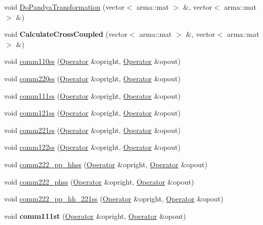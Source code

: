\begin{DoxyCompactItemize}
\item 
void \hyperlink{classOperator_ad468922e03d15318c23886e6bfecc168}{Do\-Pandya\-Transformation} (vector$<$ arma\-::mat $>$ \&, vector$<$ arma\-::mat $>$ \&)
\item 
\hypertarget{classOperator_aa9082f11f4b3aaf4bb08c058c4dca707}{void {\bfseries Calculate\-Cross\-Coupled} (vector$<$ arma\-::mat $>$ \&, vector$<$ arma\-::mat $>$ \&)}\label{classOperator_aa9082f11f4b3aaf4bb08c058c4dca707}

\item 
void \hyperlink{classOperator_a23bf6f89477ba90fd6f798374d00d9ea}{comm110ss} (\hyperlink{classOperator}{Operator} \&opright, \hyperlink{classOperator}{Operator} \&opout)
\item 
void \hyperlink{classOperator_ac924a2af30154c83d6b821707689caa5}{comm220ss} (\hyperlink{classOperator}{Operator} \&opright, \hyperlink{classOperator}{Operator} \&opout)
\item 
void \hyperlink{classOperator_a1cfdcf9d390bd8bbfdd4473c6a78071e}{comm111ss} (\hyperlink{classOperator}{Operator} \&opright, \hyperlink{classOperator}{Operator} \&opout)
\item 
void \hyperlink{classOperator_abb92eaedbea81e56c60939588371042f}{comm121ss} (\hyperlink{classOperator}{Operator} \&opright, \hyperlink{classOperator}{Operator} \&opout)
\item 
void \hyperlink{classOperator_a423dc256b5780dbee20ac81c9a655335}{comm221ss} (\hyperlink{classOperator}{Operator} \&opright, \hyperlink{classOperator}{Operator} \&opout)
\item 
void \hyperlink{classOperator_a2214e0f4647940855ff1866c2407c078}{comm122ss} (\hyperlink{classOperator}{Operator} \&opright, \hyperlink{classOperator}{Operator} \&opout)
\item 
void \hyperlink{classOperator_ad70b2fe8c17a836aa8ea8c28ad445fd0}{comm222\-\_\-pp\-\_\-hhss} (\hyperlink{classOperator}{Operator} \&opright, \hyperlink{classOperator}{Operator} \&opout)
\item 
void \hyperlink{classOperator_a030805d35049c5cd62eaa84fe42e59e9}{comm222\-\_\-phss} (\hyperlink{classOperator}{Operator} \&opright, \hyperlink{classOperator}{Operator} \&opout)
\item 
void \hyperlink{classOperator_acb2df128030bcad71f2b3fd975ea7988}{comm222\-\_\-pp\-\_\-hh\-\_\-221ss} (\hyperlink{classOperator}{Operator} \&opright, \hyperlink{classOperator}{Operator} \&opout)
\item 
\hypertarget{classOperator_ad32f3dab6883f4a0bbf3abd416c9c756}{void {\bfseries comm111st} (\hyperlink{classOperator}{Operator} \&opright, \hyperlink{classOperator}{Operator} \&opout)}\label{classOperator_ad32f3dab6883f4a0bbf3abd416c9c756}


\end{DoxyCompactItemize}
